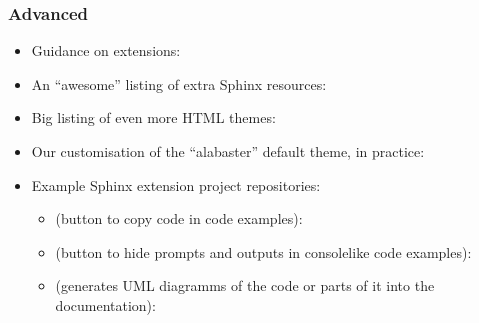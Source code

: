 \documentclass[letterpaper,10pt,english]{sphinxmanual}
\begin{document}
\subsubsection{Advanced}
\label{\detokenize{context:advanced}}\begin{itemize}
\item {} 
Guidance on extensions:

\item {} 
An “awesome” listing of extra Sphinx resources:

\item {} 
Big listing of even more HTML themes: 

\item {} 
Our customisation of the “alabaster” default theme, in practice:

\item {} 
Example Sphinx extension project repositories:
\begin{itemize}
\item {} 
 (button to copy code in code examples):

\item {} 
 (button to hide prompts and outputs in
console\sphinxhyphen{}like code examples):

\item {} 
 (generates UML diagramms of the code or parts of
it into the documentation): 

\end{itemize}

\end{itemize}
\end{document}
